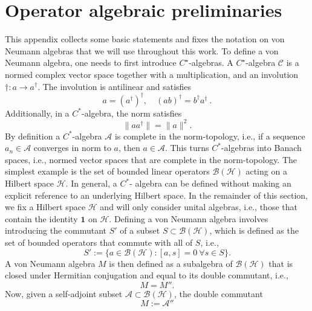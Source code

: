 \documentclass[aps,pra,reprint,superscriptaddress]{revtex4-2}
\newcommand{\cA}{{\mathcal A}}
\newcommand{\cB}{{\mathcal B}}
\newcommand{\cC}{{\mathcal C}}
\newcommand{\cH}{{\mathcal H}}
\newcommand{\id}{\mathbf 1}
\providecommand{\norm}[1]{\lVert #1\rVert}
\theoremstyle{definition}
\theoremstyle{remark}
\begin{document}
\section{Operator algebraic preliminaries}\label{app:operator-algebra-intro}
This appendix collects some basic statements and fixes the notation on von Neumann algebras that we will use throughout this work.
    To define a von Neumann algebra, one needs to first introduce
    $C^\star$-algebras. A $C^\star$-algebra $\cC$ is a normed complex vector space together with a multiplication, and an involution $\dagger: a \rightarrow a^\dagger$.
    The involution is antilinear and satisfies 
    \begin{equation}
        a = (a^\dagger)^\dagger,\quad (ab)^\dagger = b^\dagger a^\dagger \ . 
    \end{equation}
    Additionally, in a $C^\ast$-algebra, the norm satisfies
    \begin{equation}
        \norm{a a^\dagger} = \norm{a}^2.
    \end{equation}
    By definition a $C^\ast$-algebra $\cA$ is complete in the norm-topology, i.e., if a sequence $a_n \in \cA$ converges in norm to $a$, then $a \in \cA$. This turns $C^\ast$-algebras into Banach spaces, i.e., normed vector spaces that are complete in the norm-topology. 
    The simplest example is the set of bounded linear operators $\cB(\cH)$ acting on a Hilbert
    space $\cH$. In general, a $C^\ast$- algebra can be defined without making an explicit reference to an underlying Hilbert space.
    In the remainder of this section, we fix a Hilbert space $\cH$ and will only consider unital
    algebras, i.e., those that contain the identity $\id$ on $\cH$. Defining a von Neumann algebra involves introducing the commutant $S'$ of a subset $S \subset \cB(\cH)$,
    which is defined as the set of bounded operators that commute with all of
    $S$, i.e.,
    \begin{equation}
        S' := \{ a \in \cB(\cH): [a,s] = 0\ \forall s \in S \}.\label{eq:define-commutant}
    \end{equation}
    A von Neumann algebra $M$ is then defined as a subalgebra of $\cB(\cH)$ that is closed under Hermitian conjugation and equal to its double commutant, i.e.,
    \begin{equation}
        M = M''.
    \end{equation}
    Now, given a self-adjoint subset $\cA \subset \cB(\cH)$, the double commutant
    \begin{equation}
        M := \cA''
    \end{equation}
\end{document}
